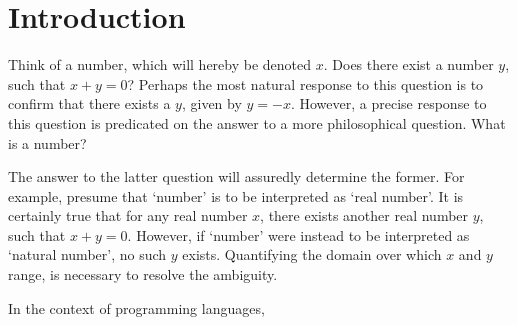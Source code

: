 \documentclass[../Dissertation.tex]{subfiles}
\begin{document}
\section{Introduction}
Think of a number, which will hereby be denoted $x$. Does there exist a number $y$, such that $x + y = 0$? Perhaps the most natural response to this question is to confirm that there exists a $y$, given by $y = -x$. However, a precise response to this question is predicated on the answer to a more philosophical question. What is a number?
\par
The answer to the latter question will assuredly determine the former. For example, presume that `number' is to be interpreted as `real number'. It is certainly true that for any real number $x$, there exists another real number $y$, such that $x + y = 0$. However, if `number' were instead to be interpreted as `natural number', no such $y$ exists. Quantifying the domain over which $x$ and $y$ range, is necessary to resolve the ambiguity. 
\par
In the context of programming languages, 
\end{document}
